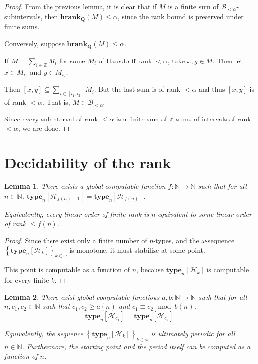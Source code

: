\documentclass{article}
\newtheorem{lemma}{Lemma}
\newcommand{\brackets}[1]{\left[ {#1} \right]}
\newcommand{\braces}[1]{\left\{ {#1} \right\}}
\newcommand{\hrank}[1]{\mathbf{hrank}_{\qq}\left( #1 \right)}
\newcommand{\qq}{\mathbf{Q}}
\newcommand{\NN}{\mathbb{N}}
\newcommand{\ZZ}{\mathbb{Z}}
\newcommand{\type}[2]{\mathbf{type}_{#1} \brackets{#2}}
\begin{document}
\begin{proof}
  From the previous lemma, it is clear that if $M$ is a finite sum of $\mathcal{B}_{< \alpha}$-subintervals,
  then $\hrank{M} \le \alpha$, since the rank bound is preserved under finite sums.

  Conversely, suppose $\hrank{M} \le \alpha$.

  If $M = \sum_{i \in \ZZ} M_i$ for some $M_i$ of Hausdorff rank $< \alpha$,
  take $x, y \in M$. Then let $x \in M_{i_1}$ and $y \in M_{i_2}$.

  Then $[x, y] \subseteq \sum_{i \in [i_1, i_2]} M_i$. But the last sum is of rank $< \alpha$
  and thus $[x, y]$ is of rank $< \alpha$. That is, $M \in \mathcal{B}_{< \alpha}$.

  Since every subinterval of rank $\le \alpha$ is a finite sum of $\ZZ$-sums of intervals of rank $< \alpha$,
  we are done.
\end{proof}

\section{Decidability of the rank}



\begin{lemma}
  There exists a global computable function $f : \NN \to \NN$ such that
  for all $n \in \NN$,
  $\type{n}{\mathcal{H}_{f(n) + 1}} = \type{n}{\mathcal{H}_{f(n)}}$.

  Equivalently, every linear order of finite rank is $n$-equivalent to some linear order of rank $\le f(n)$.
\end{lemma}

\begin{proof}
  Since there exist only a finite number of $n$-types,
  and the $\omega$-sequence $\braces{\type{n}{\mathcal{H}_{k}}}_{k \in \omega}$ is monotone,
  it must stabilize at some point.

  This point is computable as a function of $n$, because
  $\type{n}{\mathcal{H}_{k}}$ is computable for every finite $k$.
\end{proof}


\begin{lemma}
  There exist global computable functions $a, b : \NN \to \NN$ such that
  for all $n, c_1, c_2 \in \NN$ such that $c_1, c_2 \ge a(n)$ and $c_1 \equiv c_2 \mod b(n)$,
  $$\type{n}{\mathcal{H}_{c_1}} = \type{n}{\mathcal{H}_{c_2}}$$

  Equivalently, the sequence $\braces{\type{n}{\mathcal{H}_{k}}}_{k \in \omega}$ 
  is ultimately periodic for all $n \in \NN$. Furthermore, the starting point and the period
  itself can be computed as a function of $n$.
\end{lemma}
\end{document}

